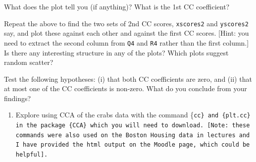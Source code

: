 \documentclass[]{book}
\newenvironment{Shaded}{\begin{snugshade}}{\end{snugshade}}
\newcommand{\CommentTok}[1]{\textcolor[rgb]{0.56,0.35,0.01}{\textit{#1}}}
\newcommand{\DecValTok}[1]{\textcolor[rgb]{0.00,0.00,0.81}{#1}}
\newcommand{\KeywordTok}[1]{\textcolor[rgb]{0.13,0.29,0.53}{\textbf{#1}}}
\newcommand{\NormalTok}[1]{#1}
\newcommand{\OperatorTok}[1]{\textcolor[rgb]{0.81,0.36,0.00}{\textbf{#1}}}
\providecommand{\tightlist}{%
  \setlength{\itemsep}{0pt}\setlength{\parskip}{0pt}}
\theoremstyle{definition}
\theoremstyle{definition}
\theoremstyle{definition}
\theoremstyle{remark}
\begin{document}
\begin{Shaded}
\end{Shaded}

What does the plot tell you (if anything)? What is the 1st CC coefficient?

Repeat the above to find the two sets of 2nd CC scores, \texttt{xscores2} and \texttt{yscores2} say, and plot these against each other and against the first CC scores. {[}Hint: you need to extract the second column from \texttt{Q4} and \texttt{R4} rather than the first column.{]} Is there any interesting structure in any of the plots? Which plots suggest random scatter?

Test the following hypotheses: (i) that both CC coefficients are zero, and (ii) that at most one of the CC coefficients is non-zero. What do you conclude from your findings?

\begin{enumerate}
\def\labelenumi{\arabic{enumi}.}
\setcounter{enumi}{1}
\tightlist
\item
  Explore using CCA of the crabs data with the command \{\tt cc\} and \{\tt plt.cc\} in the package \{\tt CCA\} which you will need to download. {[}Note: these commands were also used on the Boston Housing data in lectures and I have provided the html output on the Moodle page, which could be helpful{]}.
\end{enumerate}
\end{document}
